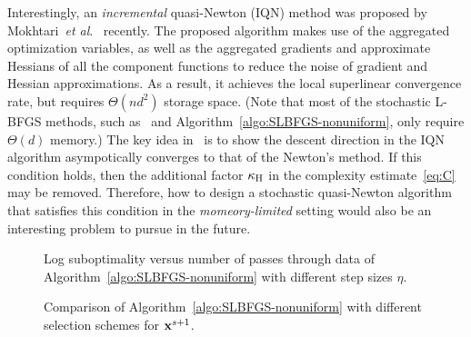 \documentclass[10pt,twocolumn,journal]{IEEEtran}
\begin{document}
Interestingly, an {\em incremental} quasi-Newton (IQN) method was proposed by Mokhtari~{\em et al}.~\cite{Mokh_17} recently. The proposed algorithm makes use of the aggregated optimization variables, as well as the aggregated gradients and approximate Hessians of all the component functions to reduce  the noise of gradient and Hessian approximations. As a result, it achieves the local superlinear convergence rate, but requires $\Theta(nd^2)$ storage space. (Note that most of the stochastic L-BFGS methods, such as~\cite{Byrd_16a,Moritz_16} and Algorithm~\ref{algo:SLBFGS-nonuniform}, only require $\Theta(d)$ memory.) 
The key idea in~\cite{Mokh_17} is to show the descent direction in the IQN algorithm asympotically converges to that of the Newton's method. If this condition holds, then the additional factor $\kappa_{\mathrm{H}}$ in the complexity estimate~\eqref{eq:C} may be removed. Therefore, how to design a stochastic quasi-Newton algorithm that satisfies this condition in the {\em momeory-limited} setting would also be an interesting problem to pursue in the future. 


\begin{figure}[t]\centering
{}\hfill
{}
\caption{Log suboptimality versus number of passes through data of Algorithm~\ref{algo:SLBFGS-nonuniform} with different step sizes $\eta$. \label{fig:etas}}
\end{figure}

\begin{figure}[t]\centering
{}\hfill
{}
\caption{Comparison of Algorithm~\ref{algo:SLBFGS-nonuniform} with different selection schemes for $\mathbf{x}^{s+1}$.\label{fig:geom_outer_itr} }
\end{figure}
\end{document}
